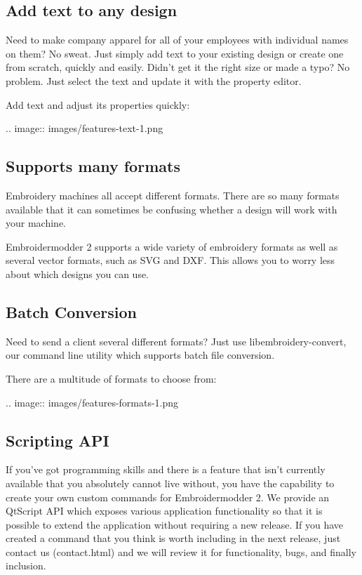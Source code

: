 \documentclass[a4paper]{report}
\begin{document}
\subsection{Add text to any design}

Need to make company apparel for all of your employees with individual names on them? No sweat.
Just simply add text to your existing design or create one from scratch, quickly and easily.
Didn't get it the right size or made a typo? No problem. Just select the text and update it
with the property editor.

Add text and adjust its properties quickly:

.. image::
   images/features-text-1.png

\subsection{Supports many formats}

Embroidery machines all accept different formats. There are so many formats
available that it can sometimes be confusing whether a design will work with your machine.

Embroidermodder 2 supports a wide variety of embroidery formats as well as several vector
formats, such as SVG and DXF. This allows you to worry less about which designs you can use.

\subsection{Batch Conversion}

Need to send a client several different formats? Just use libembroidery-convert, our command
line utility which supports batch file conversion.

There are a multitude of formats to choose from:

.. image::
   images/features-formats-1.png

\subsection{Scripting API}

If you've got programming skills and there is a feature that isn't currently available that you
absolutely cannot live without, you have the capability to create your own custom commands for
Embroidermodder 2. We provide an QtScript API which exposes various application functionality
so that it is possible to extend the application without requiring a new release. If you have
created a command that you think is worth including in the next release, just  contact
us (contact.html) and we will review it for functionality, bugs, and finally inclusion.
\end{document}

